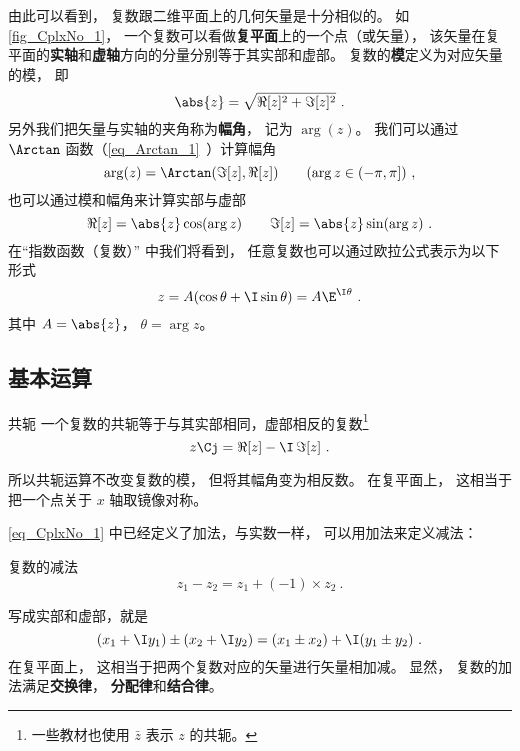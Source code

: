 由此可以看到， 复数跟二维平面上的几何矢量是十分相似的。 如\autoref{fig_CplxNo_1}， 一个复数可以看做\textbf{复平面}上的一个点（或矢量）， 该矢量在复平面的\textbf{实轴}和\textbf{虚轴}方向的分量分别等于其实部和虚部。 复数的\textbf{模}定义为对应矢量的模， 即
\begin{equation}
\abs{z} = \sqrt{\Re[z]^2 + \Im[z]^2}~.
\end{equation}
另外我们把矢量与实轴的夹角称为\textbf{幅角}， 记为 $\arg(z)$。 我们可以通过 $\Arctan$ 函数（\autoref{eq_Arctan_1}~）计算幅角
\begin{equation}\label{eq_CplxNo_5}
\arg(z) = \Arctan(\Im[z], \Re[z])
\qquad (\arg z \in (-\pi, \pi])~,
\end{equation}
也可以通过模和幅角来计算实部与虚部
\begin{equation}
\Re[z] = \abs{z}\cos(\arg z) \qquad \Im[z] = \abs{z}\sin(\arg z)~.
\end{equation}
在“指数函数（复数）” 中我们将看到， 任意复数也可以通过欧拉公式表示为以下形式
\begin{equation}
z = A(\cos\theta + \I\sin\theta) = A\E^{\I\theta}~.
\end{equation}
其中 $A = \abs{z}$， $\theta = \arg z$。

\subsection{基本运算}
\begin{definition}{共轭}
一个复数的共轭等于与其实部相同，虚部相反的复数\footnote{一些教材也使用 $\bar z$ 表示 $z$ 的共轭。}
\begin{equation}\label{eq_CplxNo_6}
z\Cj = \Re[z] - \I\, \Im[z]~.
\end{equation}
\end{definition}
所以共轭运算不改变复数的模， 但将其幅角变为相反数。 在复平面上， 这相当于把一个点关于 $x$ 轴取镜像对称。

\autoref{eq_CplxNo_1} 中已经定义了加法，与实数一样， 可以用加法来定义减法：
\begin{definition}{复数的减法}
\begin{equation}
z_1 - z_2 = z_1 + (-1) \times z_2~.
\end{equation}
\end{definition}
写成实部和虚部，就是
\begin{equation}
(x_1 + \I y_1) \pm (x_2 + \I y_2) = (x_1 \pm x_2) + \I (y_1 \pm y_2)~.
\end{equation}
在复平面上， 这相当于把两个复数对应的矢量进行矢量相加减。 显然， 复数的加法满足\textbf{交换律}， \textbf{分配律}和\textbf{结合律}。

